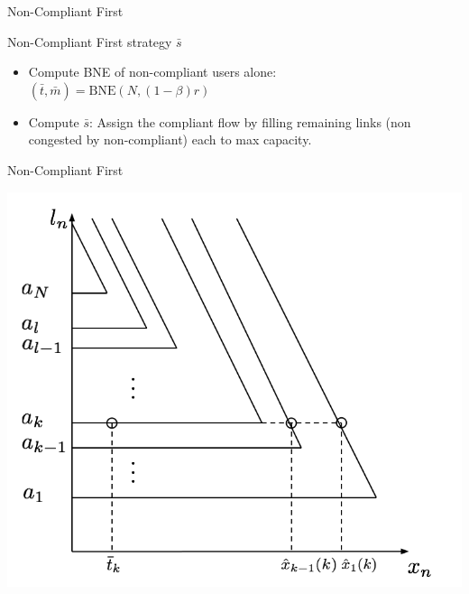 \documentclass[xcolor=svgnames, english, smaller]{beamer}
\theoremstyle{plain}
\theoremstyle{definition}
\theoremstyle{plain}
\theoremstyle{plain}
\begin{document}
\begin{frame}{Non-Compliant First}

\begin{block}{Non-Compliant First strategy $\bar{s}$}
\begin{itemize}
\item Compute BNE of non-compliant users alone: $(\bar{t}, \bar{m}) = \text{BNE}(N, (1-\beta)r)$
\item \alert{Compute $\bar{s}$: Assign the compliant flow by filling remaining links (non congested by non-compliant) each to max capacity.}
\end{itemize}
\end{block}

\end{frame}

\begin{frame}{Non-Compliant First}

\begin{center}
\includegraphics[scale=0.25]{../../figures/presentation/optimal_stackelberg2.png}
\end{center}

\end{frame}
\end{document}
